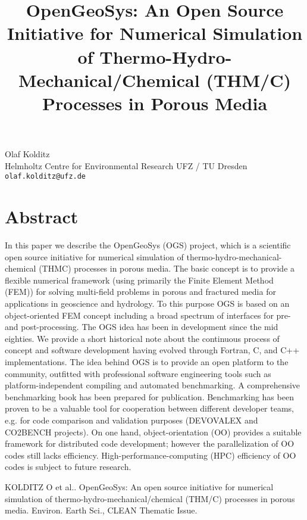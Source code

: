 \title{OpenGeoSys: An Open Source Initiative for Numerical Simulation of Thermo-Hydro-Mechanical/Chemical (THM/C) Processes in Porous Media}
 \author{} \institute{}
\maketitle
\begin{center}
{\large Olaf Kolditz}\\
Helmholtz Centre for Environmental Research UFZ / TU Dresden\\
{\tt olaf.kolditz@ufz.de}

\end{center}

\section*{Abstract}

In this paper we describe the OpenGeoSys (OGS) project, which is a scientific open source initiative for numerical simulation of thermo-hydro-mechanical-chemical (THMC) processes in porous media. The basic concept is to provide a flexible numerical framework (using primarily the Finite Element Method (FEM)) for solving multi-field problems in porous and fractured media for applications in geoscience and hydrology. To this purpose OGS is based on an object-oriented FEM concept including a broad spectrum of interfaces for pre- and post-processing. The OGS idea has been in development since the mid eighties. We provide a short historical note about the continuous process of concept and software development having evolved through Fortran, C, and C++ implementations. The idea behind OGS is to provide an open platform to the community, outfitted with professional software engineering tools such as platform-independent compiling and automated benchmarking. A comprehensive benchmarking book has been prepared for publication. Benchmarking has been proven to be a valuable tool for cooperation between different developer teams, e.g. for code comparison and validation purposes (DEVOVALEX and CO2BENCH projects). On one hand, object-orientation (OO) provides a suitable framework for distributed code development; however the parallelization of OO codes still lacks efficiency. High-performance-computing (HPC) efficiency of OO codes is subject to future research.


\begin{thebibliography}{10}

{\sc KOLDITZ O et al.}. {OpenGeoSys: An open source initiative for numerical simulation of thermo-hydro-mechanical/chemical (THM/C) processes in porous media}. Environ. Earth Sci., CLEAN Thematic Issue.

\end{thebibliography}
